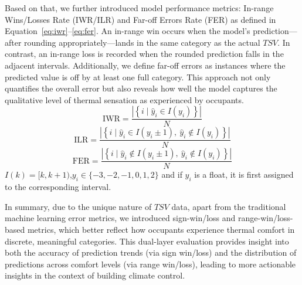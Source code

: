 Based on that, we further introduced model performance metrics: In-range Wins/Losses Rate (IWR/ILR) and Far-off Errors Rate (FER) as defined in Equation~\eqref{eq:iwr}--\eqref{eq:fer}. An in-range win occurs when the model’s prediction—after rounding appropriately—lands in the same category as the actual $TSV$. In contrast, an in-range loss is recorded when the rounded prediction falls in the adjacent intervals. Additionally, we define far-off errors as instances where the predicted value is off by at least one full category. This approach not only quantifies the overall error but also reveals how well the model captures the qualitative level of thermal sensation as experienced by occupants.
\begin{equation}
\text{IWR} = \frac{ \left| \left\{ i \mid \hat{y}_i \in I(y_i) \right\} \right| }{N}
\label{eq:iwr}
\end{equation}
\begin{equation}
\text{ILR} = \frac{ \left| \left\{ i \mid \hat{y}_i \in I(y_i \pm 1),\ \hat{y}_i \notin I(y_i) \right\} \right| }{N}
\label{eq:ilr}
\end{equation}
\begin{equation}
\text{FER} = \frac{ \left| \left\{ i \mid \hat{y}_i \notin I(y_i \pm 1),\ \hat{y}_i \notin I(y_i) \right\} \right| }{N}
\label{eq:fer}
\end{equation}
\noindent
{} \( I(k) = [k, k+1) \),\quad \( y_i \in \{-3, -2, -1, 0, 1, 2\} \) and if $y_i$ is a float, it is first assigned to the corresponding interval.

In summary, due to the unique nature of $TSV$ data, apart from the traditional machine learning error metrics, we introduced sign-win/loss and range-win/loss-based metrics, which better reflect how occupants experience thermal comfort in discrete, meaningful categories. This dual-layer evaluation provides insight into both the accuracy of prediction trends (via sign win/loss) and the distribution of predictions across comfort levels (via range win/loss), leading to more actionable insights in the context of building climate control.